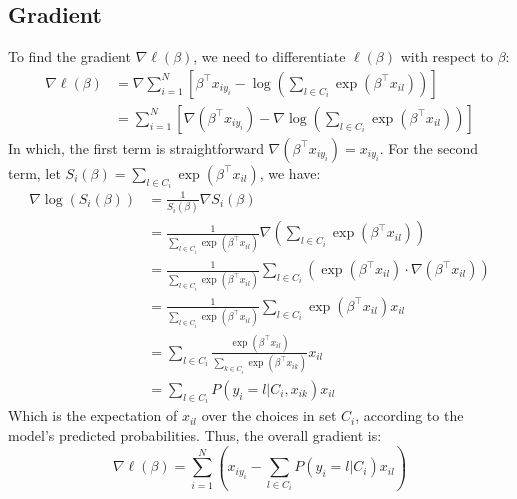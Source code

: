 \documentclass[11pt, a4paper, oneside]{memoir}
\begin{document}
\subsection{Gradient}
To find the gradient $\nabla\ell(\beta)$, we need to differentiate $\ell(\beta)$ with respect to $\beta$:
\begin{align*}
  \nabla\ell(\beta) &= \nabla \sum_{i=1}^{N} \left[ \beta^\top x_{iy_i} - \log \left( \sum_{l \in C_i} \exp(\beta^\top x_{il}) \right) \right] \\
  &= \sum_{i=1}^{N} \left[ \nabla(\beta^\top x_{iy_i}) - \nabla \log \left( \sum_{l \in C_i} \exp(\beta^\top x_{il}) \right) \right]
\end{align*}
In which, the first term is straightforward $\nabla(\beta^\top x_{iy_i}) = x_{iy_i}$.
For the second term, let $S_i(\beta) = \sum_{l \in C_i} \exp(\beta^\top x_{il})$, we have:
\begin{align*}
  \nabla \log(S_i(\beta)) &= \frac{1}{S_i(\beta)} \nabla S_i(\beta) \\
  &= \frac{1}{\sum_{l \in C_i} \exp(\beta^\top x_{il})} \nabla \left( \sum_{l \in C_i} \exp(\beta^\top x_{il}) \right) \\
  &= \frac{1}{\sum_{l \in C_i} \exp(\beta^\top x_{il})} \sum_{l \in C_i} \left( \exp(\beta^\top x_{il}) \cdot \nabla(\beta^\top x_{il}) \right) \\
  &= \frac{1}{\sum_{l \in C_i} \exp(\beta^\top x_{il})} \sum_{l \in C_i} \exp(\beta^\top x_{il}) x_{il} \\
  &= \sum_{l \in C_i} \frac{\exp(\beta^\top x_{il})}{\sum_{k \in C_i} \exp(\beta^\top x_{ik})} x_{il} \\
  &= \sum_{l \in C_i} P(y_i = l | C_i, {x_{ik}}) x_{il}
\end{align*}
Which is the expectation of $x_{il}$ over the choices in set $C_i$, according to the model's predicted probabilities.
Thus, the overall gradient is:
\[ \nabla\ell(\beta) = \sum_{i=1}^{N} \left( x_{iy_i} - \sum_{l \in C_i} P(y_i = l | C_i) x_{il} \right) \]
\end{document}
